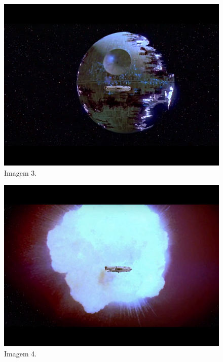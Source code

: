 \documentclass[14pt, oneside]{book}
\theoremstyle{definition}
\begin{document}
\begin{multicols}{2}
                     \begin{figure}[H]
                        \centering
                        \includegraphics[scale=0.65]{img3.png}
                        \caption{Imagem 3.}
                        \label{manual}
                     \end{figure}
                
                    \begin{figure}[H]
                        \centering
                        \includegraphics[scale=0.65]{img4.png}
                        \caption{Imagem 4.}
                        \label{manual}
                    \end{figure}
                    

\end{multicols}
\end{document}
